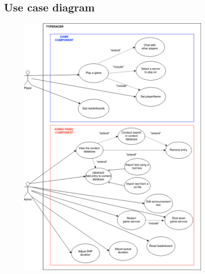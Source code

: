 \documentclass{article}
\begin{document}
\newpage
\subsection{Use case diagram}

\begin{figure}[h]
	\centering
	\includegraphics[width=0.85\textwidth]{TypeRacerUseCase.drawio.png}
\end{figure}
\end{document}
